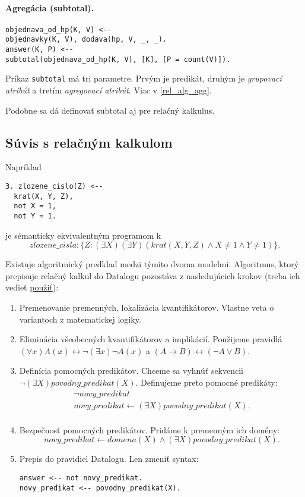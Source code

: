 \documentclass[10pt,a4paper]{article}
\begin{document}
\paragraph{Agregácia (subtotal).}
\begin{verbatim}
objednava_od_hp(K, V) <--
objednavky(K, V), dodava(hp, V, _, _).
answer(K, P) <--
subtotal(objednava_od_hp(K, V), [K], [P = count(V)]).
\end{verbatim} 

Príkaz \verb|subtotal| má tri parametre. Prvým je predikát, druhým je \emph{grupovací atribút} a tretím \emph{agregovací atribút}. Viac v \ref{rel_alg_agg}. 

Podobne sa dá definovať subtotal aj pre relačný kalkulus. 

\subsection{Súvis s relačným kalkulom}

Napríklad 
\begin{verbatim}
3. zlozene_cislo(Z) <--
  krat(X, Y, Z),
  not X = 1,
  not Y = 1.
\end{verbatim} 
je sémanticky ekvivalentným programom k $$
zlozene\_cisla: \{Z : (\exists X) (\exists Y) (krat(X,Y,Z) \wedge X \neq 1 \wedge Y \neq 1)\}.
$$


Existuje algoritmický predklad medzi týmito dvoma modelmi.
Algoritmus, ktorý prepisuje relačný kalkul do Datalogu pozostáva z nasledujúcich krokov (treba ich vedieť \underline{použiť}):

\begin{enumerate}
\item Premenovanie premenných, lokalizácia kvantifikátorov. Vlastne veta o variantoch z matematickej logiky. 

\item Eliminácia všeobecných kvantifikátorov a implikácií. Použijeme pravidlá $(\forall x)A(x) \leftrightarrow \neg (\exists x) \neg A(x)$ a $(A \rightarrow B) \leftrightarrow (\neg A \vee B)$.

\item Definícia pomocných predikátov. Chceme sa vyhnúť sekvencii $\neg (\exists X) povodny\_predikat(X)$. Definujeme preto pomocné predikáty: 
$$
\begin{array}{l}
\neg novy\_predikat \\
novy\_predikat \leftarrow (\exists X) povodny\_predikat(X).\\
\end{array} 
$$

\item Bezpečnosť pomocných predikátov. Pridáme k premenným ich domény:
$$
novy\_predikat \leftarrow domena(X) \wedge (\exists X) povodny\_predikat(X).
$$

\item Prepis do pravidiel Datalogu. Len zmeniť syntax:
\begin{verbatim}
answer <-- not novy_predikat.
novy_predikat <-- povodny_predikat(X).
\end{verbatim}

\end{enumerate}
\end{document}

